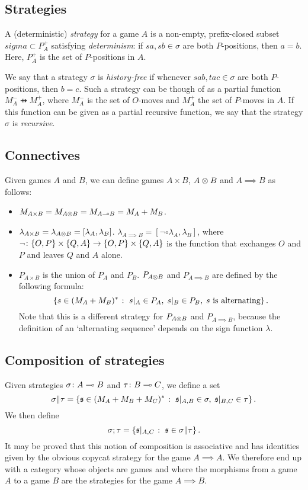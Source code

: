 \documentclass[sigplan,10pt,review]{acmart}\settopmatter{printfolios=true,printccs=false,printacmref=false}
\begin{document}
\subsection{Strategies}

A (deterministic) \emph{strategy} for a game $A$ is a non-empty, prefix-closed subset $sigma\subset P_A^+$ satisfying \emph{determinism}: if $sa,sb\in \sigma$ are both $P$-positions, then $a=b$.  
Here, $P_A^+$ is the set of $P$-positions in $A$.

We say that a strategy $\sigma$ is \emph{history-free} if whenever $sab,tac\in\sigma$ are both $P$-positions, then $b=c$.  
Such a strategy can be though of as a partial function $M_A^-\pfun M_A^+$, where $M_A^-$ is the set of $O$-moves and $M_A^+$ the set of $P$-moves in $A$.  
If this function can be given as a partial recursive function, we say that the strategy $\sigma$ is \emph{recursive}.

\subsection{Connectives}

Given games $A$ and $B$, we can define games $A\times B$, $A\otimes B$ and $A\implies B$ as follows:
\begin{itemize}
  \item $M_{A\times B}=M_{A\otimes B}=M_{A\multimap B}=M_A+M_B$.  
  \item $\lambda_{A\times B}=\lambda_{A\otimes B}=[\lambda_A,\lambda_B]$.  
    $\lambda_{A\implies B}=[\neg\circ\lambda_A,\lambda_B]$, where $\neg\colon\{O,P\}\times\{Q,A\}\to\{O,P\}\times\{Q,A\}$ is the function that exchanges $O$ and $P$ and leaves $Q$ and $A$ alone.
  \item $P_{A\times B}$ is the union of $P_A$ and $P_B$.  
    $P_{A\otimes B}$ and $P_{A\implies B}$ are defined by the following formula:
    \[
      \{s\in (M_A + M_B)^* \;\colon\; s\vert_A\in P_A,\;s\vert_B\in P_B,\;\text{$s$ is alternating}\}\,.
    \]
  Note that this is a different strategy for $P_{A\otimes B}$ and $P_{A\implies B}$, because the definition of an `alternating sequence' depends on the sign function $\lambda$.
\end{itemize}

\subsection{Composition of strategies}

Given strategies $\sigma\colon A\multimap B$ and $\tau\colon B\multimap C$, we define a set
\[
  \sigma\|\tau = \{\mathfrak s\in(M_A+M_B+M_C)^*\;\colon\; \mathfrak s\vert_{A,B}\in\sigma,\;\mathfrak s\vert_{B,C}\in\tau\}\,.
  \]
We then define
\[
  \sigma;\tau = \{\mathfrak s\vert_{A,C}\;\colon\; \mathfrak s\in\sigma\|\tau\}\,.
  \]
It may be proved \cite{ajmPcf} that this notion of composition is associative and has identities given by the obvious copycat strategy for the game $A\implies A$.  
We therefore end up with a category whose objects are games and where the morphisms from a game $A$ to a game $B$ are the strategies for the game $A\implies B$.  
\end{document}
